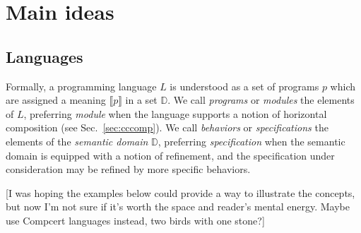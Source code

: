 \section{Main ideas}

\subsection{Languages} %

Formally,
a programming language $L$ is understood as
a set of programs $p$
which are assigned a meaning $\llbracket p \rrbracket$
in a set $\mathbb{D}$.
We call \emph{programs} or \emph{modules} the elements of $L$,
preferring \emph{module} when
the language supports
a notion of horizontal composition (see Sec.~\ref{sec:cccomp}).
We call \emph{behaviors} or \emph{specifications}
the elements of the \emph{semantic domain} $\mathbb{D}$,
preferring \emph{specification} when
the semantic domain is equipped with
a notion of refinement,
and the specification under consideration
may be refined by more specific behaviors.

[I was hoping the examples below could provide a way to illustrate
the concepts,
but now I'm not sure if it's worth the space
and reader's mental energy.
Maybe use Compcert languages instead,
two birds with one stone?]


